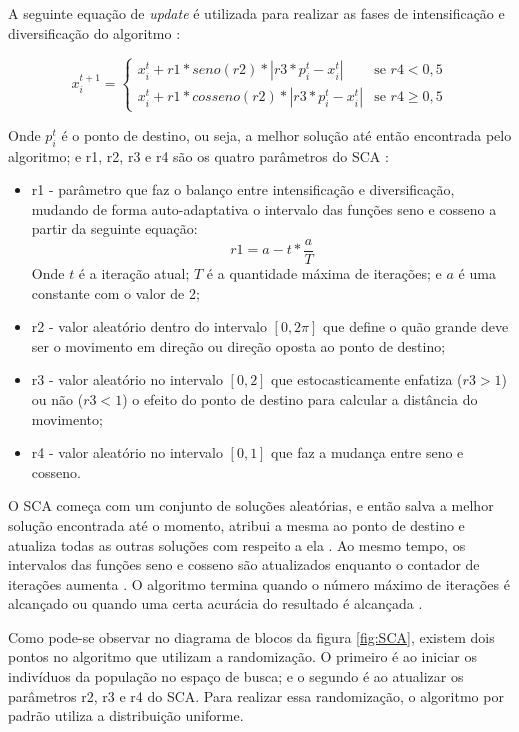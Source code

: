A seguinte equação de \textit{update} é utilizada para realizar as fases de intensificação e diversificação do algoritmo \cite{mirjalili}:

\begin{equation}
x_i^{t+1} = 
\begin{cases}
	x_i^t + r1 * seno(r2) * |r3 * p_i^t - x_i^t|    & \text{se $r4 < 0,5$}\\
    x_i^t + r1 * cosseno(r2) * |r3 * p_i^t - x_i^t| & \text{se $r4 \geq 0,5$}
\end{cases}
\end{equation}

Onde $p_i^t$ é o ponto de destino, ou seja, a melhor solução até então encontrada pelo algoritmo; e r1, r2, r3 e r4 são os quatro parâmetros do SCA \cite{mirjalili}:

\begin{itemize}
    \item r1 - parâmetro que faz o balanço entre intensificação e diversificação, mudando de forma auto-adaptativa o intervalo das funções seno e cosseno a partir da seguinte equação:
    \begin{equation}
        r1 = a - t * \frac{a}{T}
    \end{equation}
    Onde $t$ é a iteração atual; $T$ é a quantidade máxima de iterações; e $a$ é uma constante com o valor de 2;
    \item r2 - valor aleatório dentro do intervalo $[0, 2\pi]$ que define o quão grande deve ser o movimento em direção ou direção oposta ao ponto de destino;
    \item r3 - valor aleatório no intervalo $[0, 2]$ que estocasticamente enfatiza ($r3 > 1$) ou não ($r3 < 1$) o efeito do ponto de destino para calcular a distância do movimento;
    \item r4 - valor aleatório no intervalo $[0, 1]$ que faz a mudança entre seno e cosseno.
\end{itemize}

O SCA começa com um conjunto de soluções aleatórias, e então salva a melhor solução encontrada até o momento, atribui a mesma ao ponto de destino e atualiza todas as outras soluções com respeito a ela \cite{mirjalili}. Ao mesmo tempo, os intervalos das funções seno e cosseno são atualizados enquanto o contador de iterações aumenta \cite{mirjalili}. O algoritmo termina quando o número máximo de iterações é alcançado ou quando uma certa acurácia do resultado é alcançada \cite{mirjalili}.

Como pode-se observar no diagrama de blocos da figura \ref{fig:SCA}, existem dois pontos no algoritmo que utilizam a randomização. O primeiro é ao iniciar os indivíduos da população no espaço de busca; e o segundo é ao atualizar os parâmetros r2, r3 e r4 do SCA. Para realizar essa randomização, o algoritmo por padrão utiliza a distribuição uniforme.

